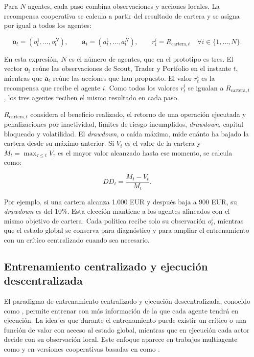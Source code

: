 Para $N$ agentes, cada paso combina observaciones y acciones locales. La recompensa cooperativa se calcula a partir del resultado de cartera y se asigna por igual a todos los agentes:

\[
\mathbf{o}_t=(o_t^1,\ldots,o_t^N),
\qquad
\mathbf{a}_t=(a_t^1,\ldots,a_t^N),
\qquad
r_t^i=R_{\mathrm{cartera},t}
\quad \forall i\in\{1,\ldots,N\}.
\]

En esta expresión, $N$ es el número de agentes, que en el prototipo es tres. El vector $\mathbf{o}_t$ reúne las observaciones de Scout, Trader y Portfolio en el instante $t$, mientras que $\mathbf{a}_t$ reúne las acciones que han propuesto. El valor $r_t^i$ es la recompensa que recibe el agente $i$. Como todos los valores $r_t^i$ se igualan a $R_{\mathrm{cartera},t}$, los tres agentes reciben el mismo resultado en cada paso.

$R_{\mathrm{cartera},t}$ considera el beneficio realizado, el retorno de una operación ejecutada y penalizaciones por inactividad, límites de riesgo incumplidos, \textit{drawdown}, capital bloqueado y volatilidad. El \textit{drawdown}, o caída máxima, mide cuánto ha bajado la cartera desde su máximo anterior. Si $V_t$ es el valor de la cartera y $M_t=\max_{\tau\leq t}V_\tau$ es el mayor valor alcanzado hasta ese momento, se calcula como:

\[
DD_t = \frac{M_t - V_t}{M_t}.
\]

Por ejemplo, si una cartera alcanza 1.000 EUR y después baja a 900 EUR, su \textit{drawdown} es del 10\%. Esta elección mantiene a los agentes alineados con el mismo objetivo de cartera. Cada política recibe solo su observación $o_t^i$, mientras que el estado global se conserva para diagnóstico y para ampliar el entrenamiento con un crítico centralizado cuando sea necesario.

\subsection{Entrenamiento centralizado y ejecución descentralizada}

El paradigma de entrenamiento centralizado y ejecución descentralizada, conocido como , permite entrenar con más información de la que cada agente tendrá en ejecución. La idea es que durante el entrenamiento puede existir un crítico o una función de valor con acceso al estado global, mientras que en ejecución cada actor decide con su observación local. Este enfoque aparece en trabajos multiagente como  \cite{lowe2017maddpg} y en versiones cooperativas basadas en  como  \cite{yu2022mappo}.

